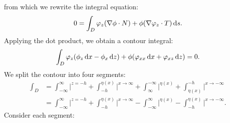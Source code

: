 \documentclass[10pt,reqno,oneside,a4paper]{article}
\begin{document}
from which we rewrite the integral equation:
\[ 
0 = \int_D \varphi_z(\nabla  \phi \cdot N) + \phi(\nabla  \varphi_z \cdot T) \,\mathrm{d} s.
\]
Applying the dot product, we obtain a contour integral:
\begin{equation}\label{DimContInt}
\int_D \varphi_z (\phi_z \,\mathrm{d} x - \phi_x \,\mathrm{d} z) + \phi(\varphi_{xx} \,\mathrm{d} x + \varphi_{xz} \,\mathrm{d} z) = 0.
\end{equation}
We split the contour into four segments:
\begin{align*}
\int_D &= \int^{\infty}_{-\infty} \bigg|^{z = -h} + \int_{-h}^{\eta(x)} \bigg|^{x \to \infty}+ \int_{\infty}^{-\infty}\bigg|^{\eta(x)} + \int_{\eta(x)}^{-h}\bigg|^{x \to -\infty} \\
&=  \int^{\infty}_{-\infty} \bigg|^{z = -h} +  \int_{-h}^{\eta(x)} \bigg|^{x \to \infty} - \int_{-\infty}^{\infty}\bigg|^{\eta(x)} -  \int^{\eta(x)}_{-h} \bigg|^{x \to -\infty}.
\end{align*}
Consider each segment:
\end{document}
